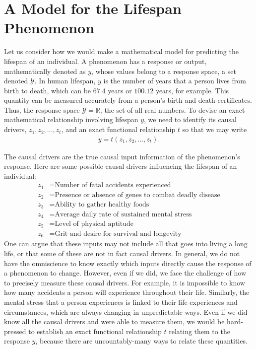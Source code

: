 \documentclass[12pt]{article}
\begin{document}
	\section{A Model for the Lifespan Phenomenon}
	
	Let us consider how we would make a mathematical model for predicting the lifespan
	of an individual. A phenomenon has a response or output, mathematically denoted as $y$,
	whose values belong to a response space, a set denoted $\mathcal{Y}$. In human lifespan,
	$y$ is the number of years that a person lives from birth to death, which can be $67.4$ years
	or $100.12$ years, for example. This quantity can be measured accurately from a person's birth
	and death certificates.	 Thus, the response space $\mathcal{Y}=\mathbb{R}$, the set of all
	real numbers. To devise an exact mathematical relationship involving lifespan $y$,
	we need to identify its causal drivers, $z_1,z_2,\ldots,z_t$, and an exact functional
	relationship $t$ so that we may write
	\begin{align*}
		y = t(z_1,z_2,\ldots,z_t).
	\end{align*}
	
	The causal drivers are the true causal input information of the phenomenon's response.
	Here are some possible causal drivers influencing the lifespan of an individual:
	\begin{align*}
		z_1 &= \text{Number of fatal accidents experienced}\\
		z_2 &= \text{Presence or absence of genes to combat deadly disease}\\
		z_3 &= \text{Ability to gather healthy foods}\\
		z_4 &= \text{Average daily rate of sustained mental stress}\\
		z_5 &= \text{Level of physical aptitude}\\
		z_6 &= \text{Grit and desire for survival and longevity}
	\end{align*}
	One can argue that these inputs may not include all that goes into living
	a long life, or that some of these are not in fact causal drivers. In general,
	we do not have the omniscience to know exactly which inputs directly cause the
	response of a phenomenon to change. However, even if we did, we face the challenge
	of how to precisely measure these causal drivers. For example, it is impossible
	to know how many accidents a person will experience throughout their life.
	Similarly, the mental stress that a person experiences is linked to their
	life experiences and circumstances, which are always changing in unpredictable ways.
	Even if we did know all the causal drivers and were able to measure them,
	we would be hard-pressed to establish an exact functional relationship $t$
	relating them to the response $y$, because there are uncountably-many
	ways to relate these quantities.
	
\end{document}
